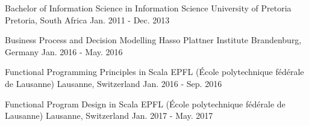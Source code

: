   \begin{cventries}
    \cventry
      {Bachelor of Information Science in Information Science} %
      {University of Pretoria} %
      {Pretoria, South Africa} %
      {Jan. 2011 - Dec. 2013} %
      {}

    \cventry
      {Business Process and Decision Modelling} %
      {Hasso Plattner Institute} %
      {Brandenburg, Germany} %
      {Jan. 2016 - May. 2016} %
      {}

    \cventry
      {Functional Programming Principles in Scala} %
      {EPFL (École polytechnique fédérale de Lausanne)} %
      {Lausanne, Switzerland} %
      {Jan. 2016 - Sep. 2016} %
      {}
      
    \cventry
      {Functional Program Design in Scala} %
      {EPFL (École polytechnique fédérale de Lausanne)} %
      {Lausanne, Switzerland} %
      {Jan. 2017 - May. 2017} %
      {}
  \end{cventries}
